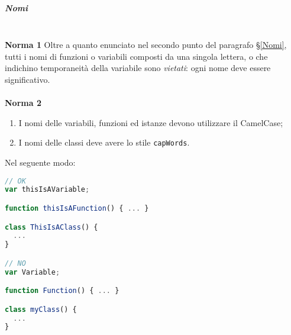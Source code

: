 \subparagraph{Nomi}\-\\
\textbf{Norma 1} Oltre a quanto enunciato nel secondo punto del paragrafo §\ref{Nomi}, tutti i nomi di funzioni o variabili composti da una singola lettera, o che indichino temporaneità della variabile sono \textit{vietati}: ogni nome deve essere significativo.\\
\-\\
\textbf{Norma 2} 
\begin{enumerate}
	\item I nomi delle variabili, funzioni ed istanze devono utilizzare il CamelCase;
	\item I nomi delle classi deve avere lo stile \texttt{capWords}.
\end{enumerate}
Nel seguente modo:
\begin{lstlisting}[language=JavaScript]
// OK
var thisIsAVariable;

function thisIsAFunction() { ... }

class ThisIsAClass() {
  ...
}

// NO
var Variable;

function Function() { ... }

class myClass() {
  ...
}
\end{lstlisting}

